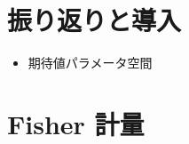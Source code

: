 \documentclass[report]{jlreq}
\begin{document}
%

%
\section{振り返りと導入}

\begin{itemize}
    \item 期待値パラメータ空間
\end{itemize}

%
\section{Fisher 計量}
\end{document}
